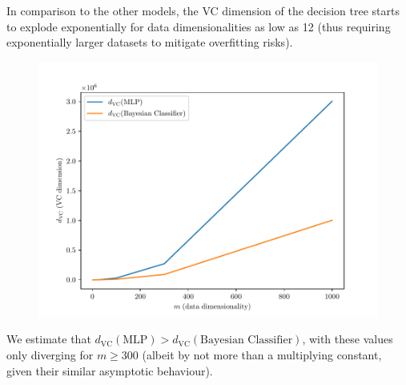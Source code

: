 \documentclass{exam}
\begin{document}
\begin{questions}
\begin{parts}
            In comparison to the other models, the VC dimension of the decision tree starts to explode exponentially for data dimensionalities as low as 12 (thus requiring exponentially larger datasets to mitigate overfitting risks).
            \vspace{1em}
            \item \quad 
            \vspace{-3.0em}
            \begin{figure}[H]
                \centering
                \includegraphics[scale = 0.75]{vc_4_b.pdf}
            \end{figure}
            We estimate that $d_{\text{VC}}(\text{MLP}) > d_{\text{VC}}(\text{Bayesian Classifier})$, with these values only diverging for $m \ge 300$ (albeit by not more than a multiplying constant, given their similar asymptotic behaviour).
        \end{parts}
    \end{questions}
\end{document}
